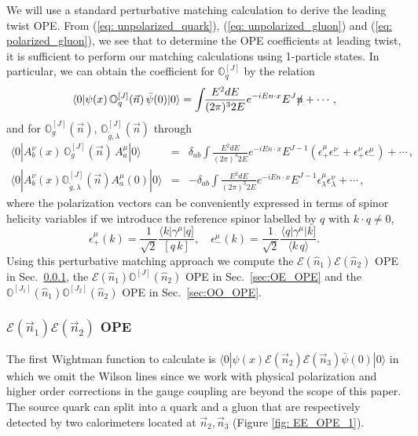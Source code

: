\documentclass[letterpaper,11pt]{article}
\def\beq{\begin{equation}}
\def\eeq{\end{equation}}
\def\bea{\begin{eqnarray}}
\def\eea{\end{eqnarray}}
\DeclareRobustCommand{\Sec}[1]{Sec.~\ref{#1}}
\def\beq{\begin{equation}}
\def\eeq{\end{equation}}
\begin{document}
We will use a standard perturbative matching calculation to derive the leading twist OPE. From (\ref{eq: unpolarized_quark}), (\ref{eq: unpolarized_gluon}) and (\ref{eq: polarized_gluon}), we see that to determine the OPE coefficients at leading twist, it is sufficient to perform our matching calculations using 1-particle states. In particular, we can obtain the coefficient for $\mathbb{O}_q^{[J]}$ by the relation
\beq
\langle 0| \psi(x) \, \mathbb{O}_q^{[J]}(\vec{n})\, \bar{\psi}(0) | 0 \rangle=\int \!\! \frac{E^2 dE}{(2\pi)^3 2 E} e^{-i E n\cdot x} E^J \slashed{n} + \cdots\,,
\eeq
and for $\mathbb{O}_g^{[J]}(\vec{n}),\, \mathbb{O}_{\tilde{g},\lambda}^{[J]}(\vec{n})$ through 
\bea
\langle 0 | A^{\nu}_{b} (x)\, \mathbb{O}_g^{[J]}(\vec{n}) \, A^{\mu}_a | 0\rangle &=& \delta_{ab} \int\!\! \frac{E^2 dE}{(2\pi)^3 2E} e^{-i E n\cdot x} E^{J-1}\left( \epsilon^{\mu}_{+} \epsilon^{\nu}_{-} + \epsilon^{\nu}_{+} \epsilon^{\mu}_{-}\right)+\cdots\,,\\
\langle 0 | A^{\nu}_{b} (x) \mathbb{O}_{\tilde{g}, \lambda}^{[J]}(\vec{n}) A^{\mu}_a(0) |0\rangle &=& -\delta_{ab} \int\!\! \frac{E^2 dE}{(2\pi)^3 2E}e^{-i E n\cdot x} E^{J-1} \epsilon^{\mu}_{\lambda} \epsilon^{\nu}_\lambda+\cdots\,,
\eea
where the polarization vectors can be conveniently expressed in terms of spinor helicity variables if we introduce the reference spinor labelled by $q$ with $k \cdot q \neq 0$,
\beq
\epsilon_{+}^{\mu}(k) =\frac{1}{\sqrt{2}} \frac{\langle k | \gamma^{\mu} | q ] }{\left[ q\, k \right]},\quad \epsilon^{\mu}_{-} (k)=\frac{1}{\sqrt{2}} \frac{\langle q | \gamma^{\mu} | k ] }{\langle k \, q\rangle}.
\eeq
Using this perturbative matching approach we compute the $\mathcal{E}(\hat n_1) \mathcal{E}(\hat n_2)$ OPE in \Sec{sec:EE_OPE}, the $\mathcal{E}(\hat n_1) \mathbb{O}^{[J]}(\hat n_2) $ OPE in \Sec{sec:OE_OPE} and the $\mathbb{O}^{[J_1]}(\hat n_1) \mathbb{O}^{[J_2]}(\hat n_2) $ OPE in \Sec{sec:OO_OPE}. 

\subsubsection{$\mathcal{E}(\vec{n}_1)\mathcal{E}(\vec{n}_2)$ OPE}\label{sec:EE_OPE}

The first Wightman function to calculate is $\langle 0 |  \psi(x) \mathcal{E}(\vec{n}_2)\mathcal{E}(\vec{n}_3) \bar{\psi}(0) | 0\rangle$ in which we omit the Wilson lines since we work with physical polarization and higher order corrections in the gauge coupling are beyond the scope of this paper. The source quark can split into a quark and a gluon that are respectively detected by two calorimeters located at $\vec{n}_2, \vec{n}_3$ (Figure \ref{fig: EE_OPE_1}). 
\end{document}
